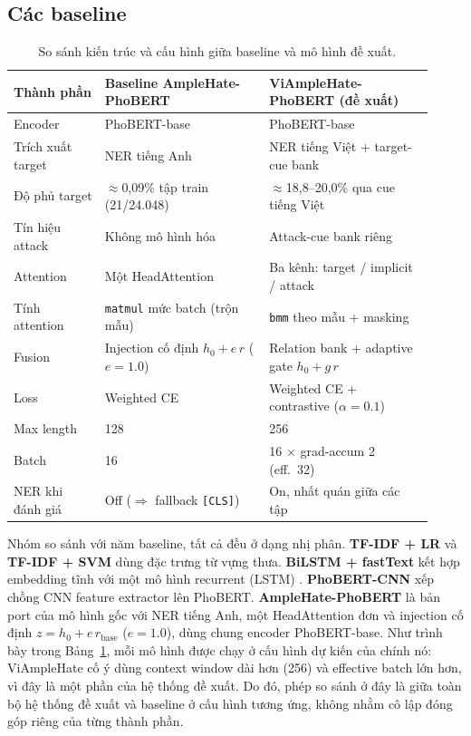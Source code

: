 \documentclass[11pt]{article}
\begin{document}
\subsection{Các baseline}
\begin{table}[!t]
  \centering
  \small
  \begin{tabular}{p{0.20\linewidth} p{0.36\linewidth} p{0.36\linewidth}}
    \toprule
    \textbf{Thành phần} & \textbf{Baseline AmpleHate-PhoBERT} & \textbf{ViAmpleHate-PhoBERT (đề xuất)} \\
    \midrule
    Encoder & PhoBERT-base & PhoBERT-base \\
    Trích xuất target & NER tiếng Anh & NER tiếng Việt + target-cue bank \\
    Độ phủ target & $\approx$0,09\% tập train (21/24{.}048) & $\approx$18,8--20,0\% qua cue tiếng Việt \\
    Tín hiệu attack & Không mô hình hóa & Attack-cue bank riêng \\
    Attention & Một HeadAttention & Ba kênh: target / implicit / attack \\
    Tính attention & \texttt{matmul} mức batch (trộn mẫu) & \texttt{bmm} theo mẫu + masking \\
    Fusion & Injection cố định $h_0+e\,r$ ($e{=}1.0$) & Relation bank + adaptive gate $h_0+g\,r$ \\
    Loss & Weighted CE & Weighted CE + contrastive ($\alpha{=}0.1$) \\
    Max length & 128 & 256 \\
    Batch & 16 & 16 $\times$ grad-accum 2 (eff.\ 32) \\
    NER khi đánh giá & Off ($\Rightarrow$ fallback \texttt{[CLS]}) & On, nhất quán giữa các tập \\
    \bottomrule
  \end{tabular}
  \caption{So sánh kiến trúc và cấu hình giữa baseline và mô hình đề xuất.}
  \label{tab:arch}
\end{table}

Nhóm so sánh với năm baseline, tất cả đều ở dạng nhị phân. \textbf{TF-IDF + LR} và \textbf{TF-IDF + SVM} dùng đặc trưng từ vựng thưa. \textbf{BiLSTM + fastText} \citep{fasttext} kết hợp embedding tĩnh với một mô hình recurrent (LSTM) \citep{hochreiter1997lstm}. \textbf{PhoBERT-CNN} \citep{to2022phobertcnn} xếp chồng CNN feature extractor lên PhoBERT. \textbf{AmpleHate-PhoBERT} là bản port của mô hình gốc với NER tiếng Anh, một HeadAttention đơn và injection cố định $z=h_0+e\,r_{\mathrm{base}}$ ($e=1.0$), dùng chung encoder PhoBERT-base. Như trình bày trong Bảng~\ref{tab:arch}, mỗi mô hình được chạy ở cấu hình dự kiến của chính nó: ViAmpleHate cố ý dùng context window dài hơn (256) và effective batch lớn hơn, vì đây là một phần của hệ thống đề xuất. Do đó, phép so sánh ở đây là giữa toàn bộ hệ thống đề xuất và baseline ở cấu hình tương ứng, không nhằm cô lập đóng góp riêng của từng thành phần.
\end{document}
